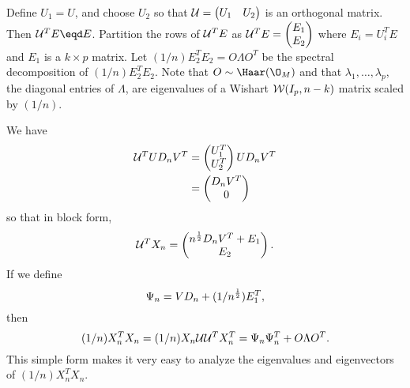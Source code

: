 Define $U_1 = U$, and choose $U_2$ so that
\(
    \mathcal{U} 
    = 
    \left( 
    \begin{matrix}
        U_1 & U_2 
    \end{matrix}
    \right)
\) 
is an orthogonal matrix. Then $\U^T E \eqd E$.  Partition the rows of $\mathcal{U}^T E$ as 
\(
    \mathcal{U}^T E 
    = 
    \left(
    \begin{matrix}
        E_1 \\ E_2
    \end{matrix}
    \right)
\)
where $E_i = U_i^T E$ and $E_1$ is a $k \times p$ matrix.  Let $(1/n) E_2^T E_2 = O \Lambda O^T$ be the spectral decomposition of $(1/n) E_2^T E_2$.  Note that $O \sim \Haar(\O_M)$ and that $\lambda_1, \ldots, \lambda_p$, the diagonal entries of $\Lambda$, are eigenvalues of a Wishart $\mathcal{W}(I_p, n-k)$ matrix scaled by $(1/n)$.  

We have
\begin{align*}
    \mathcal{U}^T U D_n V^T
        &= \left(
           \begin{matrix}
               U_1^T \\ 
               U_2^T
           \end{matrix}
           \right) 
           U D_n V^T \\
        &= \left(
           \begin{matrix}
               D_n V^T \\
               0
           \end{matrix}
           \right)
\end{align*}
so that in block form,
\[
    \mathcal{U}^T X_n
    =
    \left(
    \begin{matrix}
            n^{\frac{1}{2}} D_n V^T + E_1  \\
            E_2
    \end{matrix}
    \right).
\]
If we define 
\begin{equation} \label{E:psi}
    \Psi_n = V D_n + (1 / n^{\frac{1}{2}}) E_1^T,
\end{equation}
then 
\begin{equation}\label{E:arrow}
    (1/n) X_n^T X_n = (1/n) X_n \mathcal{U} \mathcal{U}^T X_n^T = \Psi_n \Psi_n^T + O \Lambda O^T.
\end{equation}
This simple form makes it very easy to analyze the eigenvalues and eigenvectors of $(1/n) X_n^T X_n$.

